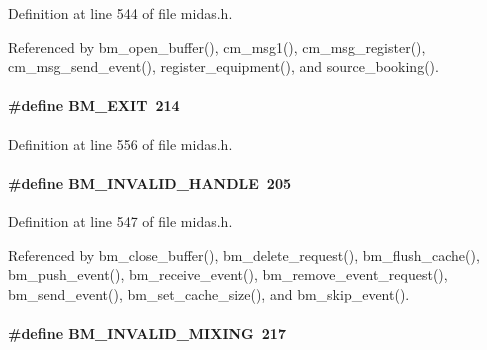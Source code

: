 \begin{DoxyItemize}
\item 
\end{DoxyItemize}

Definition at line 544 of file midas.h.

Referenced by bm\_\-open\_\-buffer(), cm\_\-msg1(), cm\_\-msg\_\-register(), cm\_\-msg\_\-send\_\-event(), register\_\-equipment(), and source\_\-booking().
\paragraph[{BM\_\-EXIT}]{\setlength{\rightskip}{0pt plus 5cm}\#define BM\_\-EXIT~214}\hfill\label{group__err22_gaa73f629c281190fdd092eed493b5245a}

\begin{DoxyItemize}
\item 
\end{DoxyItemize}

Definition at line 556 of file midas.h.
\paragraph[{BM\_\-INVALID\_\-HANDLE}]{\setlength{\rightskip}{0pt plus 5cm}\#define BM\_\-INVALID\_\-HANDLE~205}\hfill\label{group__err22_ga992d6577e774ebe1c50b501917c788b8}

\begin{DoxyItemize}
\item 
\end{DoxyItemize}

Definition at line 547 of file midas.h.

Referenced by bm\_\-close\_\-buffer(), bm\_\-delete\_\-request(), bm\_\-flush\_\-cache(), bm\_\-push\_\-event(), bm\_\-receive\_\-event(), bm\_\-remove\_\-event\_\-request(), bm\_\-send\_\-event(), bm\_\-set\_\-cache\_\-size(), and bm\_\-skip\_\-event().
\paragraph[{BM\_\-INVALID\_\-MIXING}]{\setlength{\rightskip}{0pt plus 5cm}\#define BM\_\-INVALID\_\-MIXING~217}\hfill\label{group__err22_ga57d1cf336a7a69397d8a6b1d2d40bf27}

